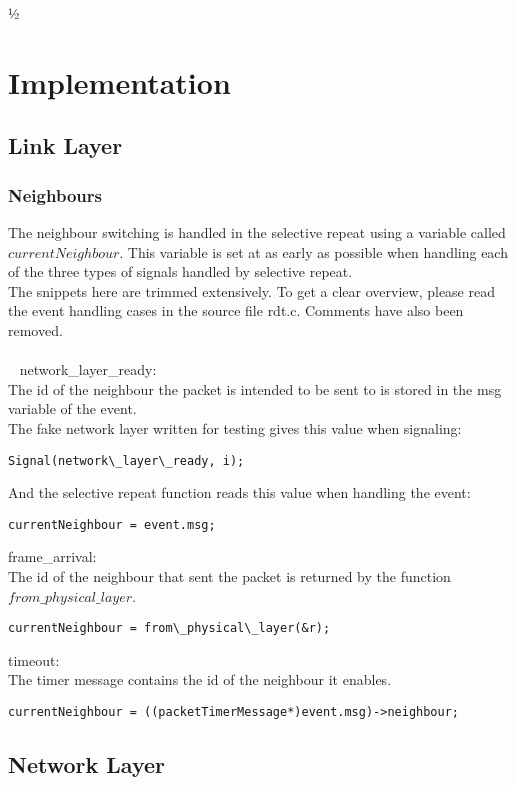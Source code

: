 ½\section{Implementation}

\subsection{Link Layer}
\subsubsection{Neighbours}
The neighbour switching is handled in the selective repeat using a variable called $currentNeighbour$. This variable is set at as early as possible when handling each of the three types of signals handled by selective repeat.\\
The snippets here are trimmed extensively. To get a clear overview, please read the event handling cases in the source file rdt.c. Comments have also been removed.\\
\\~
network\_layer\_ready:\\
The id of the neighbour the packet is intended to be sent to is stored in the msg variable of the event.\\
The fake network layer written for testing gives this value when signaling:
\begin{lstlisting}
Signal(network\_layer\_ready, i);
\end{lstlisting}
And the selective repeat function reads this value when handling the event:
\begin{lstlisting}
currentNeighbour = event.msg;
\end{lstlisting}

frame\_arrival:\\
The id of the neighbour that sent the packet is returned by the function $from\_physical\_layer$.
\begin{lstlisting}
currentNeighbour = from\_physical\_layer(&r);
\end{lstlisting}

timeout:\\
The timer message contains the id of the neighbour it enables.
\begin{lstlisting}
currentNeighbour = ((packetTimerMessage*)event.msg)->neighbour;
\end{lstlisting}

\subsection{Network Layer}
